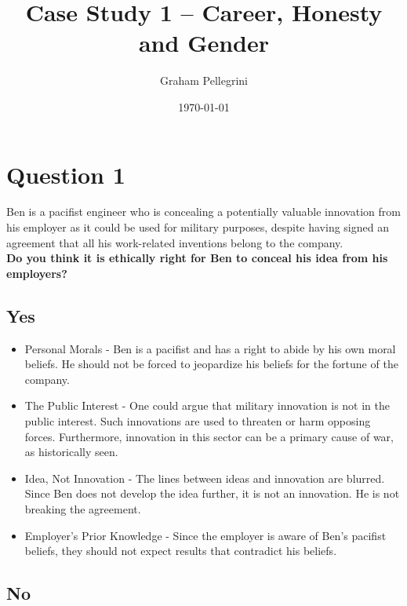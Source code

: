 \documentclass{article}
\title{Case Study 1 – Career, Honesty and Gender}
\author{Graham Pellegrini}
\date{\today}
\begin{document}
\maketitle

\section{Question 1}
Ben is a pacifist engineer who is concealing a potentially valuable innovation from his employer as it could be used for military purposes, despite having signed an agreement that all his work-related inventions belong to the company.\\

\textbf{Do you think it is ethically right for Ben to conceal his idea from his employers?}

\subsection{Yes}

\begin{itemize}
    \item Personal Morals - Ben is a pacifist and has a right to abide by his own moral beliefs. He should not be forced to jeopardize his beliefs for the fortune of the company.
    \item The Public Interest - One could argue that military innovation is not in the public interest. Such innovations are used to threaten or harm opposing forces. Furthermore, innovation in this sector can be a primary cause of war, as historically seen.
    \item Idea, Not Innovation - The lines between ideas and innovation are blurred. Since Ben does not develop the idea further, it is not an innovation. He is not breaking the agreement.
    \item Employer's Prior Knowledge - Since the employer is aware of Ben's pacifist beliefs, they should not expect results that contradict his beliefs.
\end{itemize}

\subsection{No}
\end{document}
